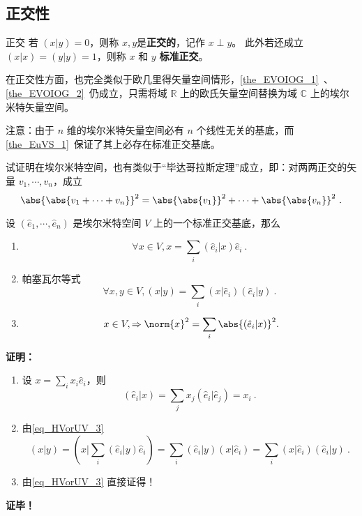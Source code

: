 \subsection{正交性}
\begin{definition}{正交}
若 $(  x|  y)=0$，则称 $  x,  y$是\textbf{正交的}，记作 $  x\perp  y$。
此外若还成立 $(  x|  x)=(  y|  y)=1$，则称 $  x$ 和 $  y$ \textbf{标准正交}。
\end{definition}
在正交性方面，也完全类似于欧几里得矢量空间情形，\autoref{the_EVOIOG_1}~、\autoref{the_EVOIOG_2}~仍成立，只需将域 $\mathbb{R}$ 上的欧氏矢量空间替换为域 $\mathbb{C}$ 上的埃尔米特矢量空间。

注意：由于 $n$ 维的埃尔米特矢量空间必有 $n$ 个线性无关的基底，而\autoref{the_EuVS_1}~保证了其上必存在标准正交基底。
\begin{example}{}
试证明在埃尔米特空间，也有类似于“毕达哥拉斯定理”成立，即：对两两正交的矢量 $  v_1,\cdots,  v_n$，成立
\begin{equation}
\abs{\abs{  v_1+\cdots+  v_n}}^2=\abs{\abs{  v_1}}^2+\cdots+\abs{\abs{  v_n}}^2~.
\end{equation}
\end{example}

\begin{theorem}{}
设 $(\hat e_1,\cdots, \hat e_n)$ 是埃尔米特空间 $V$ 上的一个标准正交基底，那么
\begin{enumerate}
\item \begin{equation}\label{eq_HVorUV_3}
\forall  x\in V,  x=\sum_{i}( \hat e_i|  x)\hat e_i~.
\end{equation}
\item 帕塞瓦尔等式
\begin{equation}
\forall  x,  y\in V,(  x|  y)=\sum_{i}(  x|\hat e_i)(  \hat e_i|  y)~.
\end{equation}
\item \begin{equation}
\  x\in V,\Rightarrow\norm{  x}^2=\sum_{i}\abs{(  \hat e_i|  x)}^2.
\end{equation}
\end{enumerate}
\end{theorem}
\textbf{证明：}\begin{enumerate}
\item 设 $  x=\sum_{i}x_i 
 \hat e_i$，则
\begin{equation}
( \hat e_i|  x)=\sum_{j}x_j( \hat e_i| \hat e_j)=x_i~.
\end{equation}
\item 由\autoref{eq_HVorUV_3} 
\begin{equation}
(  x|  y)=(  x|\sum_{i}( \hat e_i|  y) \hat e_i)=\sum_{i}( \hat e_i|  y)(  x| \hat e_i)=\sum_{i}(  x| \hat e_i)( \hat e_i|  y)~.
\end{equation}
\item 由\autoref{eq_HVorUV_3} 直接证得！
\end{enumerate}
\textbf{证毕！}
